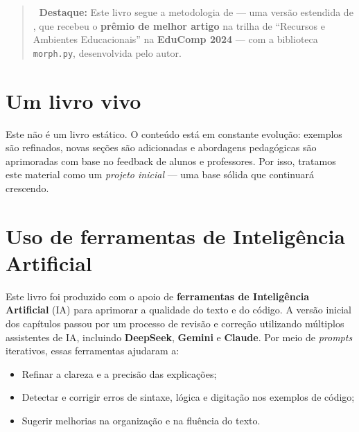\documentclass[
  portuguese,
  letterpaper,
  openany,
  oneside,
  12pt,
  a4paper]{book}
\providecommand{\tightlist}{%
  \setlength{\itemsep}{0pt}\setlength{\parskip}{0pt}}
\begin{document}
\begin{quote}
📘 \textbf{Destaque:} Este livro segue a metodologia de
\textcite{zampirolli2025morph} --- uma versão estendida de
\textcite{zampirolli2024practical}, que recebeu o \textbf{prêmio de
melhor artigo} na trilha de ``Recursos e Ambientes Educacionais'' na
\textbf{EduComp 2024} --- com a biblioteca \texttt{morph.py},
desenvolvida pelo autor.
\end{quote}

\section*{Um livro vivo}\label{um-livro-vivo}


Este não é um livro estático. O conteúdo está em constante evolução:
exemplos são refinados, novas seções são adicionadas e abordagens
pedagógicas são aprimoradas com base no feedback de alunos e
professores. Por isso, tratamos este material como um \emph{projeto
inicial} --- uma base sólida que continuará crescendo.

\section*{Uso de ferramentas de Inteligência
Artificial}\label{uso-de-ferramentas-de-inteliguxeancia-artificial}


Este livro foi produzido com o apoio de \textbf{ferramentas de
Inteligência Artificial} (IA) para aprimorar a qualidade do texto e do
código. A versão inicial dos capítulos passou por um processo de revisão
e correção utilizando múltiplos assistentes de IA, incluindo
\textbf{DeepSeek}, \textbf{Gemini} e \textbf{Claude}. Por meio de
\emph{prompts} iterativos, essas ferramentas ajudaram a:

\begin{itemize}
\tightlist
\item
  Refinar a clareza e a precisão das explicações;
\item
  Detectar e corrigir erros de sintaxe, lógica e digitação nos exemplos
  de código;
\item
  Sugerir melhorias na organização e na fluência do texto.
\end{itemize}
\end{document}
